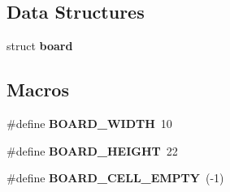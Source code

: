 \subsection*{Data Structures}
\begin{DoxyCompactItemize}
\item 
struct \textbf{ board}
\end{DoxyCompactItemize}
\subsection*{Macros}
\begin{DoxyCompactItemize}
\item 
\#define \textbf{ B\+O\+A\+R\+D\+\_\+\+W\+I\+D\+TH}~10
\item 
\#define \textbf{ B\+O\+A\+R\+D\+\_\+\+H\+E\+I\+G\+HT}~22
\item 
\#define \textbf{ B\+O\+A\+R\+D\+\_\+\+C\+E\+L\+L\+\_\+\+E\+M\+P\+TY}~(-\/1)
\end{DoxyCompactItemize}
